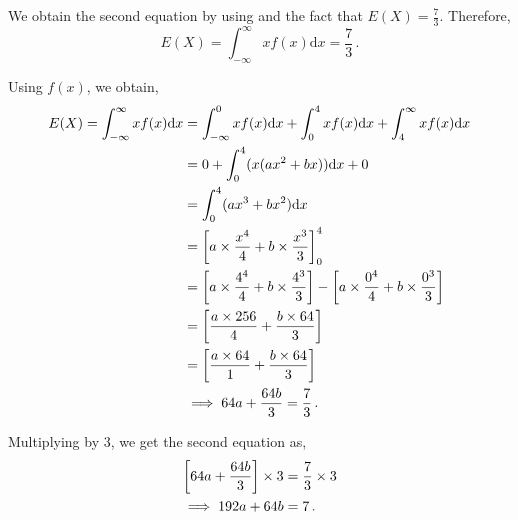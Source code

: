 \begin{subquestions}
\begin{subsubquestions}
We obtain the second equation by using  and the fact that $E(X) = \frac{7}{3}$. Therefore,
\begin{equation}
		E(X) = \int_{-\infty}^{\infty}x f(x)\mathrm{d}x = \frac{7}{3}\,.
\end{equation}

Using $f(x)$, we obtain,
\begin{align}
	E(X) = \int_{-\infty}^{\infty}x f(x)\mathrm{d}x & = \int_{-\infty}^{0} xf(x)\mathrm{d}x + \int_{0}^{4}xf(x) \mathrm{d}x + \int_{4}^{\infty} xf(x)\mathrm{d}x \nonumber \\
	& = 0 + \int_{0}^{4} (x(ax^2 +bx))\mathrm{d}x + 0  \nonumber \\
	                                        & = \int_{0}^{4} (ax^3 +bx^2)\mathrm{d}x \nonumber \\
	                                        & = \left[a \times \frac{x^4}{4} + b \times \frac{x^3}{3} \right]^{4}_{0} \nonumber \\
	                                        & = \left[a \times \frac{4^4}{4} + b \times \frac{4^3}{3} \right] - \left[a \times \frac{0^4}{4} + b \times \frac{0^3}{3} \right] \nonumber \\
	                                        & = \left[\frac{a \times 256}{4} + \frac{b \times 64}{3} \right] \nonumber \\
	                                        & = \left[\frac{a \times 64}{1} + \frac{b \times 64}{3} \right] \nonumber \\
	                                        & \implies 64a + \frac{64b}{3} = \frac{7}{3} \,. \label{2012:q3:CRV2}
\end{align}

Multiplying  by 3, we get the second equation as,
\begin{align}
		\left[64a + \frac{64b}{3} \right] \times 3  & = \frac{7}{3} \times 3 \nonumber \\
		 \implies 192a + 64b & = 7 \,. \label{2012:q3:CRV3}
\end{align}


\end{subsubquestions}
\end{subquestions}
